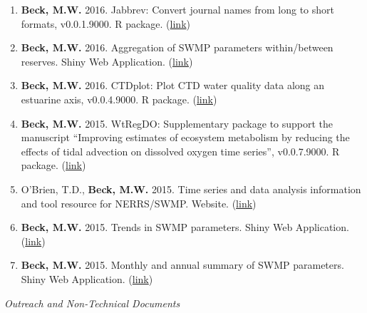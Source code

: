 \documentclass[letterpaper,12pt]{article}
\begin{document}
\begin{enumerate}
\item \textbf{Beck, M.W.} 2016. Jabbrev: Convert journal names from long to short formats, v0.0.1.9000. R package. ({\footnotesize\href{https://github.com/fawda123/Jabbrev}{link}})

\item \textbf{Beck, M.W.} 2016. Aggregation of SWMP parameters within/between reserves. Shiny Web Application. ({\footnotesize\href{http://beckmw.shinyapps.io/swmp_agg}{link}})

\item \textbf{Beck, M.W.} 2016. CTDplot: Plot CTD water quality data along an estuarine axis, v0.0.4.9000. R package. ({\footnotesize\href{https://github.com/fawda123/CTDplot}{link}})

\item \textbf{Beck, M.W.} 2015. WtRegDO: Supplementary package to support the manuscript ``Improving estimates of ecosystem metabolism by reducing the effects of tidal advection on dissolved oxygen time series'', v0.0.7.9000. R package. ({\footnotesize\href{http://github.com/fawda123/WtRegDO}{link}})

\item O'Brien, T.D., \textbf{Beck, M.W.} 2015. Time series and data analysis information and tool resource for NERRS/SWMP. Website. ({\footnotesize\href{http://swmprats.net/}{link}})

\item \textbf{Beck, M.W.} 2015. Trends in SWMP parameters. Shiny Web Application. ({\footnotesize\href{http://beckmw.shinyapps.io/swmp_comp/}{link}})

\item \textbf{Beck, M.W.} 2015. Monthly and annual summary of SWMP parameters. Shiny Web Application. ({\footnotesize\href{http://beckmw.shinyapps.io/swmp_summary/}{link}})

\end{enumerate}

\vspace{\baselineskip} 
\centerline{\large{\textit{Outreach and Non-Technical Documents}}}
\end{document}
